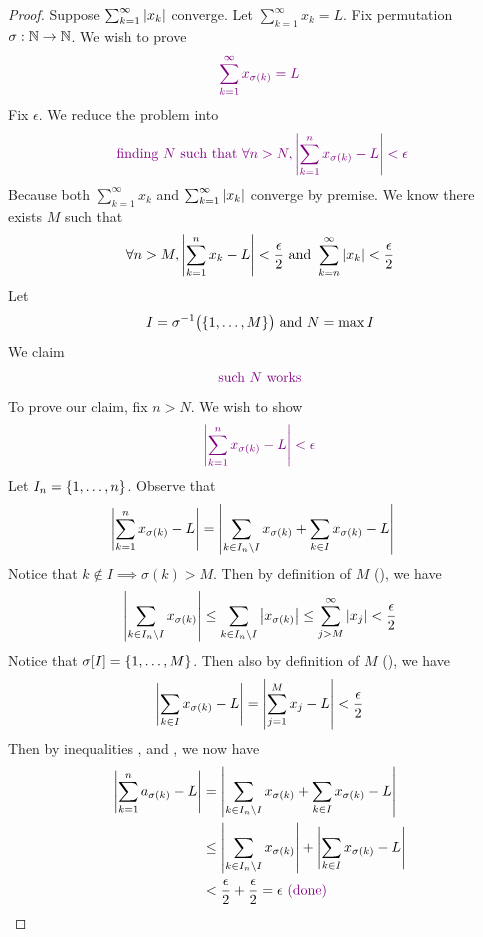 \documentclass{report}
\begin{document}
\begin{proof}
Suppose $\sum_{k=1}^\infty \left|x_k\right|$ converge. Let $\sum_{k=1}^\infty x_k=L$. Fix permutation $\sigma :\mathbb{N}\rightarrow \mathbb{N}$. We wish to prove 
\begin{align*}
  \textcolor{violet}{\sum_{k=1}^\infty x_{\sigma(k)}=L}
\end{align*}
Fix $\epsilon $. We reduce the problem into  
 \begin{align*}
   \textcolor{violet}{\text{ finding $N$ such that }\forall n>N, \left|\sum_{k=1}^n x_{\sigma (k)}- L\right| <\epsilon }
\end{align*}
Because both $\sum_{k=1}^\infty x_k$ and $\sum_{k=1}^\infty \left|x_k\right|$ converge by premise. We know there exists $M$ such that 
\begin{align}
\label{e5}
  \forall n>M, \left|\sum_{k=1}^n x_k -L\right|<\frac{\epsilon}{2}\text{ and } \sum_{k=n}^\infty \left|x_k\right|<\frac{\epsilon}{2}
\end{align}
Let 
\begin{align*}
I=\sigma^{-1}\big(\{ 1,\dots ,M \} \big)\text{ and }N=\max I
\end{align*}
We claim 
\begin{align*}
\textcolor{violet}{\text{ such $N$ works }}
\end{align*}
To prove our claim, fix $n>N$. We wish to show 
 \begin{align*}
   \textcolor{violet}{\left|\sum_{k=1}^n x_{\sigma (k)}-L\right|<\epsilon }
\end{align*}
Let $I_n=\{ 1,\dots , n \}$. Observe that 
\begin{align}
\label{e6}
\left|\sum_{k=1}^n x_{\sigma(k)}-L\right|&= \left|\sum_{k \in I_n \setminus I} x_{\sigma (k)}+ \sum_{k \in I} x_{\sigma (k)} - L \right|
\end{align}
Notice that $k \not \in I \implies  \sigma (k)>M$. Then by definition of $M$  (), we have
\begin{align}
  \label{e7}
\left|\sum_{k \in I_n \setminus I} x_{\sigma (k)} \right|\leq \sum_{k \in I_n \setminus  I} \left|x_{\sigma(k)}\right|\leq \sum_{j>M}^\infty \left|x_j\right|< \frac{\epsilon}{2}
\end{align}
Notice that $\sigma [I]=\{ 1,\dots , M \}$. Then also by definition of $M$  (), we have 
\begin{align}
\label{e8}
\left|\sum_{k \in I}x_{\sigma(k)}- L\right|= \left|\sum_{j=1}^M x_j-L\right|< \frac{\epsilon}{2}
\end{align}
Then by inequalities ,  and , we now have 
\begin{align*}
\left|\sum_{k=1}^n a_{\sigma(k)}-L\right| &= \left|\sum_{k \in I_n \setminus I}x_{\sigma(k)} + \sum_{k \in I} x_{\sigma(k)}-L\right|\\
&\leq \left|\sum_{k \in I_n \setminus I}x_{\sigma(k)}\right|+\left|\sum_{k \in I} x_{\sigma(k)}-L\right| \\
&< \frac{\epsilon }{2}+\frac{\epsilon}{2}=\epsilon \textcolor{violet}{\text{ (done) }} 
\end{align*}
\end{proof}
\end{document}
